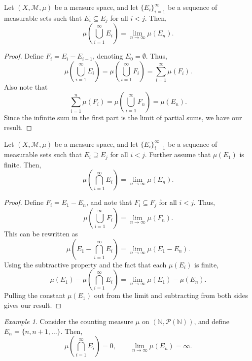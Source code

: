 \documentclass[11pt]{article}
\newcommand{\N}{\mathbb{N}}
\newcommand{\M}{\mathcal{M}}
\theoremstyle{definition}
\theoremstyle{remark}
\newtheorem*{example}{Example}
\numberwithin{equation}{section}
\begin{document}
    \begin{theorem}
        Let $(X, \M, \mu)$ be a measure space, and let $\{E_i\}_{i = 1}^\infty$
        be a sequence of measurable sets such that $E_i \subseteq E_j$ for all $i <
        j$. Then, \[
            \mu\left(\bigcup_{i = 1}^\infty E_i\right) = \lim_{n \to \infty}
            \mu(E_n).
        \] 
    \end{theorem}
    \begin{proof}
        Define $F_i = E_i - E_{i - 1}$, denoting $E_0 = \emptyset$. Thus, \[
            \mu\left(\bigcup_{i = 1}^\infty E_i\right) = \mu\left(\bigcup_{i =
            1}^\infty F_i\right) = \sum_{i = 1}^\infty \mu(F_i).
        \] Also note that \[
            \sum_{i = 1}^n \mu(F_i) = \mu\left(\bigcup_{i = 1}^\infty F_n\right) =
            \mu(E_n).
        \] Since the infinite sum in the first part is the limit of partial sums, we
        have our result.
    \end{proof}
    
    \begin{theorem}
        Let $(X, \M, \mu)$ be a measure space, and let $\{E_i\}_{i = 1}^\infty$
        be a sequence of measurable sets such that $E_i \supseteq E_j$ for all $i <
        j$. Further assume that $\mu(E_1)$ is finite. Then, \[
            \mu\left(\bigcap_{i = 1}^\infty E_i\right) = \lim_{n \to \infty}
            \mu(E_n).
        \] 
    \end{theorem}
    \begin{proof}
        Define $F_i = E_1 - E_n$, and note that $F_i \subseteq F_j$ for all $i < j$.
        Thus, \[
            \mu\left(\bigcup_{i = 1}^\infty F_i\right) = \lim_{n \to \infty}
            \mu(F_n).
        \] This can be rewritten as \[
            \mu\left(E_1 - \bigcap_{i = 1}^\infty E_i\right) = \lim_{n \to \infty}
            \mu(E_1 - E_n).
        \] Using the subtractive property and the fact that each $\mu(E_i)$ is
        finite, \[
            \mu(E_1) - \mu\left(\bigcap_{i = 1}^\infty E_i\right) = \lim_{n \to \infty}
            \mu(E_1) - \mu(E_n).
        \] Pulling the constant $\mu(E_1)$ out from the limit and subtracting from
        both sides gives our result.
    \end{proof}
    \begin{example}
        Consider the counting measure $\mu$ on $(\N, \mathcal{P}(\N))$, and define
        $E_n = \{n, n + 1, \dots \}$. Then, \[
            \mu\left(\bigcap_{i = 1}^\infty E_i\right) = 0, \qquad \lim_{n \to
            \infty} \mu(E_n) = \infty.
        \] 
    \end{example}
\end{document}
